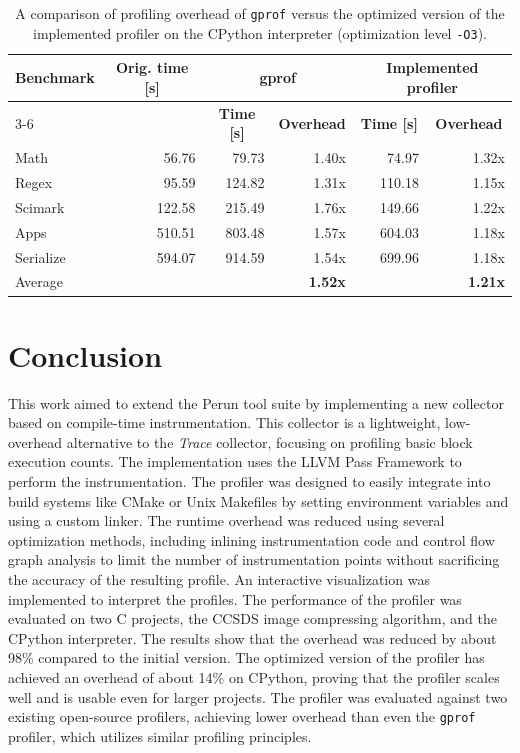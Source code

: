 \begin{table}[H]
    \centering
    \begin{tabular}{lrrrrr}
    \multicolumn{1}{l}{\multirow{2}{*}{\textbf{Benchmark}}} & \multicolumn{1}{c}{\multirow{2}{*}{\textbf{Orig. time [s]}}} & \multicolumn{2}{c}{\textbf{gprof}} & \multicolumn{2}{c}{\textbf{Implemented profiler}} \\
    \cline{3-6} 
    \multicolumn{1}{l}{} & \multicolumn{1}{c}{} & \multicolumn{1}{c}{\textbf{Time [s]}} & \multicolumn{1}{c}{\textbf{Overhead}} & \multicolumn{1}{c}{\textbf{Time [s]}} & \multicolumn{1}{c}{\textbf{Overhead}} \\ 
    \hline
    \hline
    Math & 56.76 & 79.73 & 1.40x & 74.97 & 1.32x \\
    Regex & 95.59 & 124.82 & 1.31x  & 110.18 & 1.15x \\
    Scimark & 122.58 & 215.49 & 1.76x & 149.66 & 1.22x \\
    Apps & 510.51 & 803.48 & 1.57x & 604.03 & 1.18x \\
    Serialize & 594.07 & 914.59 & 1.54x & 699.96 & 1.18x \\
    \hline
    \multicolumn{1}{l}{Average} & & & \textbf{1.52x} & & \textbf{1.21x} \\
    \end{tabular}
    \caption{A comparison of profiling overhead of \texttt{gprof} versus the optimized version of the implemented profiler on the CPython interpreter (optimization level \texttt{-O3}).}
    \label{tab:cpython-gprof}
\end{table}



\chapter{Conclusion}
\label{conclusion}

This work aimed to extend the Perun tool suite by implementing a new collector based on compile-time instrumentation. This collector is a lightweight, low-overhead alternative to the \emph{Trace} collector, focusing on profiling basic block execution counts. The implementation uses the LLVM Pass Framework to perform the instrumentation. The profiler was designed to easily integrate into build systems like CMake or Unix Makefiles by setting environment variables and using a custom linker. The runtime overhead was reduced using several optimization methods, including inlining instrumentation code and control flow graph analysis to limit the number of instrumentation points without sacrificing the accuracy of the resulting profile. An interactive visualization was implemented to interpret the profiles. The performance of the profiler was evaluated on two C projects, the CCSDS image compressing algorithm, and the CPython interpreter. The results show that the overhead was reduced by about 98\% compared to the initial version. The optimized version of the profiler has achieved an overhead of about 14\% on CPython, proving that the profiler scales well and is usable even for larger projects. The profiler was evaluated against two existing open-source profilers, achieving lower overhead than even the \texttt{gprof} profiler, which utilizes similar profiling principles.

